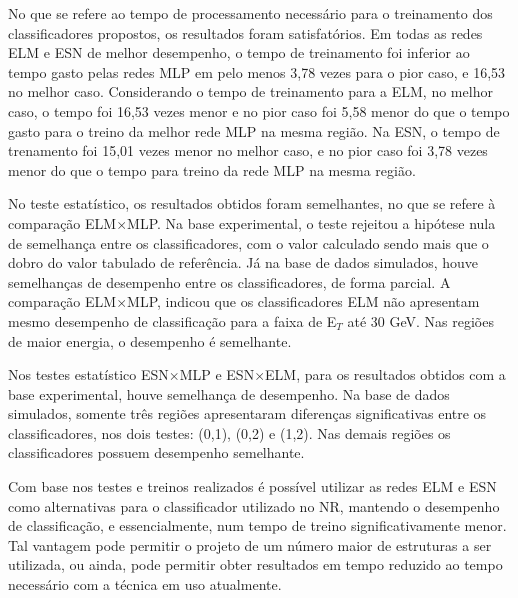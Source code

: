 No que se refere ao tempo de processamento necessário para o treinamento dos classificadores propostos, os resultados foram satisfatórios. Em todas as redes ELM e ESN de melhor desempenho, o tempo de treinamento foi inferior ao tempo gasto pelas redes MLP em pelo menos 3,78 vezes para o pior caso, e 16,53 no melhor caso. Considerando o tempo de treinamento para a ELM, no melhor caso, o tempo foi  16,53 vezes menor e no pior caso foi 5,58 menor do que o tempo gasto para o treino da melhor rede MLP na mesma região. Na ESN, o tempo de trenamento foi 15,01 vezes menor no melhor caso, e no pior caso foi 3,78 vezes menor do que o tempo para treino da rede MLP na mesma região.

No teste estatístico, os resultados obtidos foram semelhantes, no que se refere à comparação ELM$\times$MLP. Na base experimental, o teste rejeitou a hipótese nula de semelhança entre os classificadores, com o valor calculado sendo mais que o dobro do valor tabulado de referência. Já na base de dados simulados, houve semelhanças de desempenho entre os classificadores, de forma parcial. A comparação ELM$\times$MLP, indicou que os classificadores ELM não apresentam mesmo desempenho de classificação para a faixa de E$_T$ até 30 GeV. Nas regiões de maior energia, o desempenho é semelhante.

Nos testes estatístico ESN$\times$MLP e ESN$\times$ELM, para os resultados obtidos com a base experimental, houve semelhança de desempenho. Na base de dados simulados, somente três regiões apresentaram diferenças significativas entre os classificadores, nos dois testes: (0,1), (0,2) e (1,2). Nas demais regiões os classificadores possuem desempenho semelhante.




Com base nos testes e treinos realizados é possível utilizar as redes ELM e ESN como alternativas para o classificador utilizado no NR, mantendo o desempenho de classificação, e essencialmente, num tempo de treino significativamente menor. Tal vantagem pode permitir o projeto de um número maior de estruturas a ser utilizada, ou ainda, pode permitir obter resultados em tempo reduzido ao tempo necessário com a técnica em uso atualmente.


